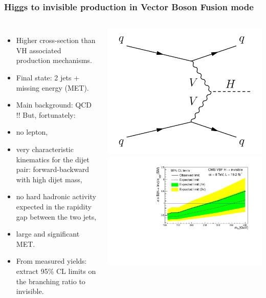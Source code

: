 \documentclass[red,compress,xcolor=table]{beamer}
\begin{document}
\begin{frame}
\frametitle{Higgs to invisible production in Vector Boson Fusion mode}

\begin{columns}
\begin{itemize}
\item \scriptsize Higher cross-section than VH associated production mechanisms.
\item \scriptsize Final state: 2 jets + missing energy (MET).
\item \scriptsize Main background: QCD !! But, fortunately:
\item \scriptsize no lepton,
\item \scriptsize very characteristic kinematics for the dijet pair: forward-backward with high dijet mass,
\item \scriptsize no hard hadronic activity expected in the rapidity gap between the two jets,
\item \scriptsize large and significant MET.
\item \scriptsize From measured yields: extract 95\% CL limits on the branching ratio to invisible.
\end{itemize}
\includegraphics[width=1.0\textwidth]{./qqHqq.png}\\
\includegraphics[width=1.0\textwidth]{./vbflimit.pdf}

\end{columns}
\end{frame}
\end{document}
